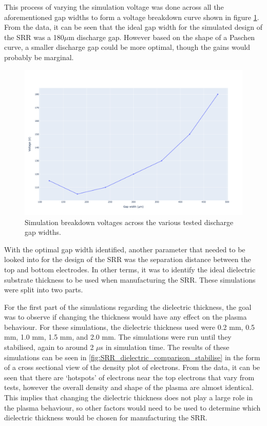 This process of varying the simulation voltage was done across all the aforementioned gap widths to form a voltage breakdown curve shown in figure \ref{fig:gap_widths_breakdown_voltage}. From the data, it can be seen that the ideal gap width for the simulated design of the SRR was a 180$\mu$m discharge gap. However based on the shape of a Paschen curve, a smaller discharge gap  could be more optimal, though the gains would probably be marginal.

\begin{figure}[h!]
	\centering
	\includegraphics[width=0.7\linewidth]{chapter_4/figures/gap_widths_breakdown_voltage.png}
	\caption{Simulation breakdown voltages across the various tested discharge gap widths.}
	\label{fig:gap_widths_breakdown_voltage}
\end{figure}

With the optimal gap width identified, another parameter that needed to be looked into for the design of the SRR was the separation distance between the top and bottom electrodes. In other terms, it was to identify the ideal dielectric substrate thickness to be used when manufacturing the SRR. These simulations were split into two parts.

For the first part of the simulations regarding the dielectric thickness, the goal was to observe if changing the thickness would have any effect on the plasma behaviour. For these simulations, the dielectric thickness used were 0.2 mm, 0.5 mm, 1.0 mm, 1.5 mm, and 2.0 mm. The simulations were run until they stabilised, again to around 2 $\mu$s in simulation time. The results of these simulations can be seen in \ref{fig:SRR_dielectric_comparison_stabilise} in the form of a cross sectional view of the density plot of electrons. From the data, it can be seen that there are `hotspots' of electrons near the top electrons that vary from tests, however the overall density and shape of the plasma are almost identical. This implies that changing the dielectric thickness does not play a large role in the plasma behaviour, so other factors would need to be used to determine which dielectric thickness would be chosen for manufacturing the SRR.

